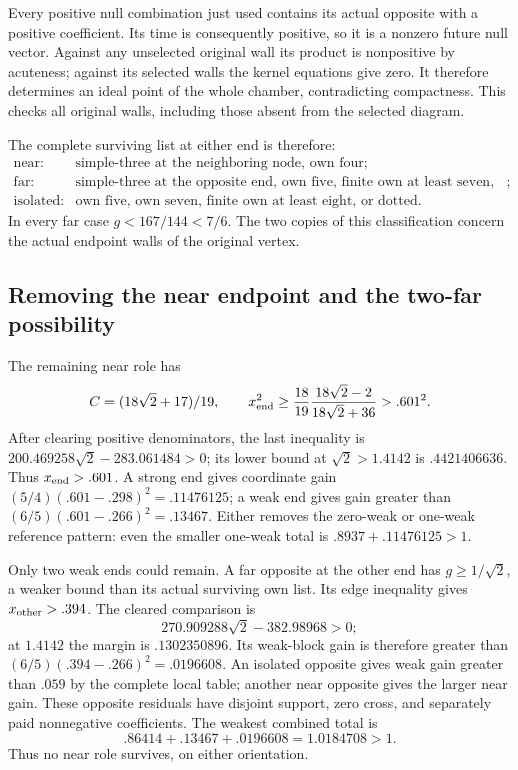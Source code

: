 Every positive null combination just used contains its actual
opposite with a positive coefficient. Its time is consequently
positive, so it is a nonzero future null vector. Against any
unselected original wall its product is nonpositive by acuteness;
against its selected walls the kernel equations give zero.
It therefore determines an ideal point of the whole chamber,
contradicting compactness. This checks all original walls,
including those absent from the selected diagram.

The complete surviving list at either end is therefore:
\[
 \begin{array}{ll}
 \text{near:}&\text{simple-three at the neighboring node, own four};\\
 \text{far:}&\text{simple-three at the opposite end, own five,
                finite own at least seven, or dotted};\\
 \text{isolated:}&\text{own five, own seven,
                finite own at least eight, or dotted}.
 \end{array}
\]
In every far case \(g<167/144<7/6\).
The two copies of this classification concern the actual endpoint
walls of the original vertex.

\subsection{Removing the near endpoint and the two-far possibility}
\label{app:A18nearfar}
The remaining near role has
\[
 C=(18\sqrt2+17)/19,\qquad
 x_{\rm end}^2\geq
 \frac{18}{19}\frac{18\sqrt2-2}{18\sqrt2+36}>.601^2.
\]
After clearing positive denominators, the last inequality is
\(200.469258\sqrt2-283.061484>0\); its lower bound at
\(\sqrt2>1.4142\) is \(.4421406636\).
Thus \(x_{\rm end}>.601\).
A strong end gives coordinate gain
\((5/4)(.601-.298)^2=.11476125\);
a weak end gives gain greater than
\((6/5)(.601-.266)^2=.13467\).
Either removes the zero-weak or one-weak reference pattern:
even the smaller one-weak total is
\(.8937+.11476125>1\).

Only two weak ends could remain. A far opposite at the other end
has \(g\geq1/\sqrt2\), a weaker bound than its actual surviving
own list. Its edge inequality gives \(x_{\rm other}>.394\).
The cleared comparison is
\[
 270.909288\sqrt2-382.98968>0;
\]
at \(1.4142\) the margin is \(.1302350896\).
Its weak-block gain is therefore greater than
\((6/5)(.394-.266)^2=.0196608\).
An isolated opposite gives weak gain greater than \(.059\)
by the complete local table; another near opposite gives the
larger near gain. These opposite residuals have disjoint support,
zero cross, and separately paid nonnegative coefficients.
The weakest combined total is
\[
 .86414+.13467+.0196608=1.0184708>1.
\]
Thus no near role survives, on either orientation.

